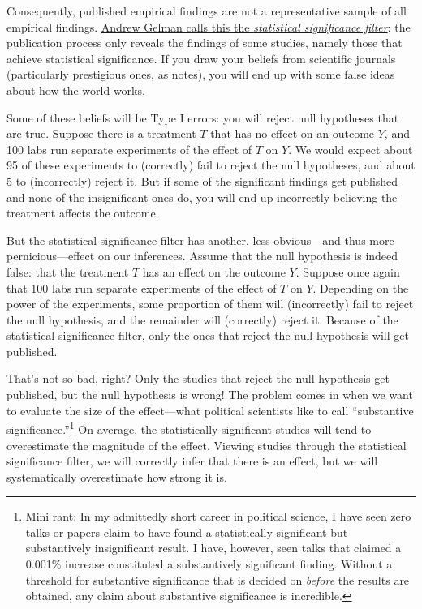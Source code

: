 \documentclass[12pt,oneside,openany]{book}
\begin{document}
Consequently, published empirical findings are not a representative
sample of all empirical findings.
\href{http://andrewgelman.com/2011/09/10/the-statistical-significance-filter/}{Andrew
Gelman calls this the \emph{statistical significance filter}}: the
publication process only reveals the findings of some studies, namely
those that achieve statistical significance. If you draw your beliefs
from scientific journals (particularly prestigious ones, as
\citet{ioannidis2008most} notes), you will end up with some false ideas
about how the world works.

Some of these beliefs will be Type I errors: you will reject null
hypotheses that are true. Suppose there is a treatment \(T\) that has no
effect on an outcome \(Y\), and 100 labs run separate experiments of the
effect of \(T\) on \(Y\). We would expect about 95 of these experiments
to (correctly) fail to reject the null hypotheses, and about 5 to
(incorrectly) reject it. But if some of the significant findings get
published and none of the insignificant ones do, you will end up
incorrectly believing the treatment affects the outcome.

But the statistical significance filter has another, less obvious---and
thus more pernicious---effect on our inferences. Assume that the null
hypothesis is indeed false: that the treatment \(T\) has an effect on
the outcome \(Y\). Suppose once again that 100 labs run separate
experiments of the effect of \(T\) on \(Y\). Depending on the power of
the experiments, some proportion of them will (incorrectly) fail to
reject the null hypothesis, and the remainder will (correctly) reject
it. Because of the statistical significance filter, only the ones that
reject the null hypothesis will get published.

That's not so bad, right? Only the studies that reject the null
hypothesis get published, but the null hypothesis is wrong! The problem
comes in when we want to evaluate the size of the effect---what
political scientists like to call ``substantive
significance.''\footnote{Mini rant: In my admittedly short career in
  political science, I have seen zero talks or papers claim to have
  found a statistically significant but substantively insignificant
  result. I have, however, seen talks that claimed a 0.001\% increase
  constituted a substantively significant finding. Without a threshold
  for substantive significance that is decided on \emph{before} the
  results are obtained, any claim about substantive significance is
  incredible.} On average, the statistically significant studies will
tend to overestimate the magnitude of the effect. Viewing studies
through the statistical significance filter, we will correctly infer
that there is an effect, but we will systematically overestimate how
strong it is.
\end{document}
